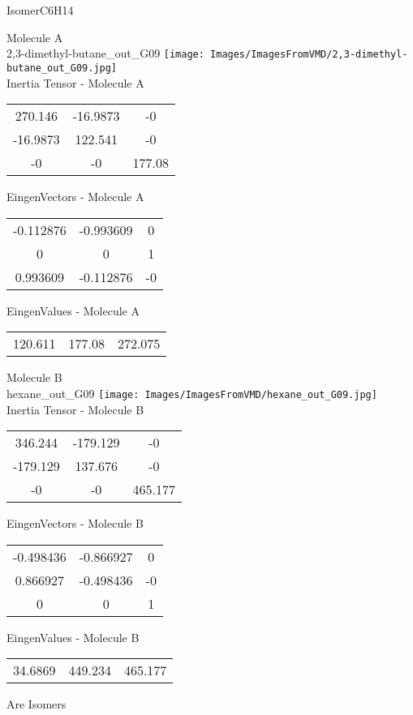 \vtab[-2cm]
\begin{center}
{\large IsomerC6H14}
\end{center}
\begin{multicols}{2}
\begin{center}
Molecule A \\ 
2,3-dimethyl-butane\_out\_G09
\texttt{[image: Images/ImagesFromVMD/2,3-dimethyl-butane\_out\_G09.jpg]}
\\
Inertia Tensor - Molecule A \\
\vtab
\begin{tabular}{|c c c|}
270.146	 & 	-16.9873	 & 	-0	 \\
-16.9873	 & 	122.541	 & 	-0	 \\
-0	 & 	-0	 & 	177.08
\end{tabular}

\vtab
 EingenVectors - Molecule A     \\
\vtab
\begin{tabular}{|c c c|}
-0.112876	 & 	-0.993609	 & 	0	 \\
0	 & 	0	 & 	1	 \\
0.993609	 & 	-0.112876	 & 	-0
\end{tabular}

\vtab
 EingenValues - Molecule A     \\
\vtab
\begin{tabular}{|c c c|}
120.611	 & 	177.08	 & 	272.075
\end{tabular}
\columnbreak

Molecule B \\ 
hexane\_out\_G09
\texttt{[image: Images/ImagesFromVMD/hexane\_out\_G09.jpg]}
\\
Inertia Tensor - Molecule B \\
\vtab
\begin{tabular}{|c c c|}
346.244	 & 	-179.129	 & 	-0	 \\
-179.129	 & 	137.676	 & 	-0	 \\
-0	 & 	-0	 & 	465.177
\end{tabular}

\vtab
 EingenVectors - Molecule B     \\
\vtab
\begin{tabular}{|c c c|}
-0.498436	 & 	-0.866927	 & 	0	 \\
0.866927	 & 	-0.498436	 & 	-0	 \\
0	 & 	0	 & 	1
\end{tabular}

\vtab
 EingenValues - Molecule B     \\
\vtab
\begin{tabular}{|c c c|}
34.6869	 & 	449.234	 & 	465.177
\end{tabular}

\end{center}
\end{multicols}
\begin{center}
\vtab
\vtab
\textcolor{NavyBlue}{\Large Are Isomers}
\end{center}
\newpage

